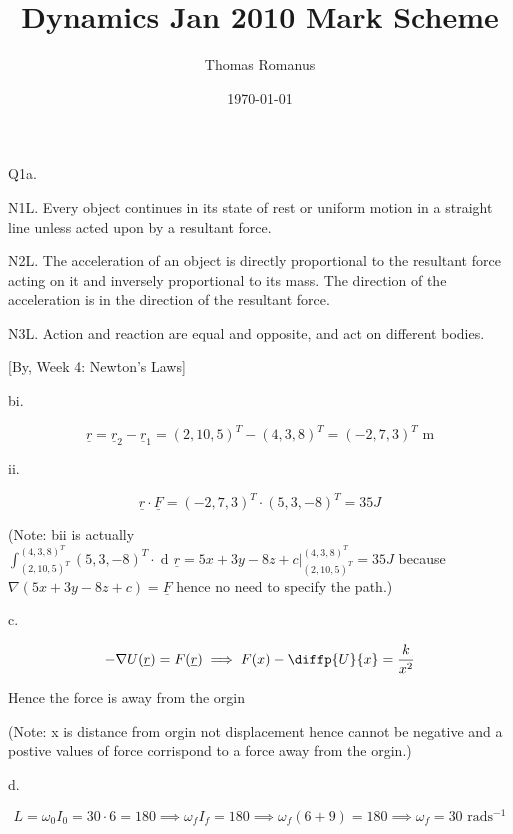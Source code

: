\documentclass[12pt]{article}
\title{Dynamics Jan 2010 Mark Scheme}
\author{Thomas Romanus}
\date{\today}
\DeclareMathOperator{\di}{d\!}
\begin{document}
    \maketitle

    Q1a.

    N1L.  Every object continues in its state of rest or uniform motion in a straight line unless acted upon by a resultant force.

    N2L.  The acceleration of an object is directly proportional to the resultant force acting on it and inversely proportional to its mass. The direction of the acceleration is in the direction of the resultant force.

    N3L.  Action and reaction are equal and opposite, and act on different bodies.

    [By, Week 4: Newton's Laws]

    bi.

    \begin{equation*}
        \underline{r}=\underline{r}_2-\underline{r}_1=(2,10,5)^T-(4,3,8)^T=(-2,7,3)^T\text{ m}
    \end{equation*}

    ii.

    \begin{equation*}
        \underline{r}\cdot\underline{F}=(-2,7,3)^T\cdot (5,3,-8)^T=35J
    \end{equation*}

    (Note: bii is actually $\int_{(2,10,5)^T}^{(4,3,8)^T}(5,3,-8)^T\cdot\di \underline{r}=5x+3y-8z+c|_{(2,10,5)^T}^{(4,3,8)^T}=35J$ because $\nabla (5x+3y-8z+c)=\underline{F}$ hence no need to specify the path.)

    c.

    \begin{equation*}
        -\nabla U(\underline{r})=F(\underline{r})\implies F(x)-\diffp{U}{x}=\frac{k}{x^2}
    \end{equation*}

    Hence the force is away from the orgin

    (Note: x is distance from orgin not displacement hence cannot be negative and a postive values of force corrispond to a force away from the orgin.)

    d.

    \begin{equation*}
        L=\omega_0 I_0=30\cdot6=180\implies\omega_fI_f=180\implies\omega_f(6+9)=180\implies\omega_f=30\text{ rads$^{-1}$}
    \end{equation*}
\end{document}
